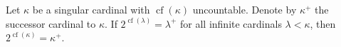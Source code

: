 Let $\kappa$ be a singular cardinal with $\operatorname{cf}(\kappa)$ uncountable. Denote by $\kappa^+$ the successor cardinal to $\kappa$. If $2^{\operatorname{cf}(\lambda)} = \lambda^+$ for all infinite cardinals $\lambda < \kappa$, then $2^{\operatorname{cf}(\kappa)} = \kappa^+$.